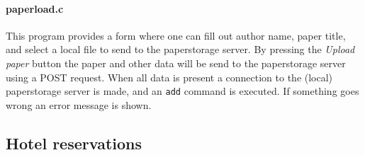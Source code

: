 \documentclass[a4paper,10pt]{article}
\begin{document}
\paragraph{paperload.c}
This program provides a form where one can fill out author name, paper title, and
select a local file to send to the paperstorage server. By pressing the
\textit{Upload paper} button the paper and other data will be send to the paperstorage
server using a \textsc{POST} request. When all data is present a connection to the
(local) paperstorage server is made, and an \texttt{add} command is executed. If
something goes wrong an error message is shown.

\subsection{Hotel reservations}
\end{document}
